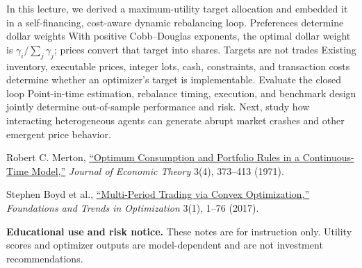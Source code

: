 \documentclass[11pt]{article}
\begin{document}
\keytakeaways
  {In this lecture, we derived a maximum-utility target allocation and embedded it in a self-financing, cost-aware dynamic rebalancing loop.}
  {Preferences determine dollar weights}
  {With positive Cobb--Douglas exponents, the optimal dollar weight is $\gamma_i/\sum_j\gamma_j$; prices convert that target into shares.}
  {Targets are not trades}
  {Existing inventory, executable prices, integer lots, cash, constraints, and transaction costs determine whether an optimizer's target is implementable.}
  {Evaluate the closed loop}
  {Point-in-time estimation, rebalance timing, execution, and benchmark design jointly determine out-of-sample performance and risk.}
  {Next, study how interacting heterogeneous agents can generate abrupt market crashes and other emergent price behavior.}

\begin{readinglist}
  \item Robert C. Merton, \href{https://doi.org/10.1016/0022-0531(71)90038-X}{``Optimum Consumption and Portfolio Rules in a Continuous-Time Model,''} \emph{Journal of Economic Theory} 3(4), 373--413 (1971).
  \item Stephen Boyd et al., \href{https://web.stanford.edu/~boyd/papers/pdf/multi_period_trading.pdf}{``Multi-Period Trading via Convex Optimization,''} \emph{Foundations and Trends in Optimization} 3(1), 1--76 (2017).
\end{readinglist}

{\sffamily\footnotesize\color{vnmuted}\textbf{Educational use and risk notice.} These notes are for instruction only. Utility scores and optimizer outputs are model-dependent and are not investment recommendations.}
\end{document}
